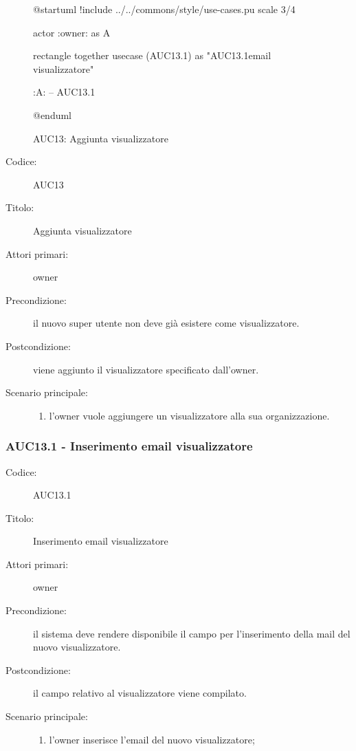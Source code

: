 \documentclass[../../../analisi-dei-requisiti.tex]{subfiles}
\begin{document}
\begin{figure}[h!]
  \centering
  \begin{plantuml}
  @startuml
  !include ../../commons/style/use-cases.pu
  scale 3/4

  actor :owner: as A

  rectangle {
    together {
      usecase (AUC13.1) as "AUC13.1\nInserimento email visualizzatore"
    }
  }

  :A: -- AUC13.1

  @enduml
  \end{plantuml}
  \caption{AUC13: Aggiunta visualizzatore}
  \label{fig:auc13}
\end{figure}

\begin{description}
  \item[Codice:] AUC13
  \item[Titolo:] Aggiunta visualizzatore
  \item[Attori primari:] owner
  \item[Precondizione:] il nuovo super utente non deve già esistere come visualizzatore.
  \item[Postcondizione:] viene aggiunto il visualizzatore specificato dall'owner.
  \item[Scenario principale:]
  \begin{enumerate}
    \item l'owner vuole aggiungere un visualizzatore alla sua organizzazione.
  \end{enumerate}
\end{description}

\subsubsection{AUC13.1 - Inserimento email visualizzatore}%
\label{subsub:AUC13.1}
\begin{description}
  \item[Codice:] AUC13.1
  \item[Titolo:] Inserimento email visualizzatore
  \item[Attori primari:] owner
  \item[Precondizione:] il sistema deve rendere disponibile il campo per l'inserimento della mail del nuovo visualizzatore.
  \item[Postcondizione:] il campo relativo al visualizzatore viene compilato.
  \item[Scenario principale:]
  \begin{enumerate}
    \item l'owner inserisce l'email del nuovo visualizzatore;
  \end{enumerate}
\end{description}
\end{document}
